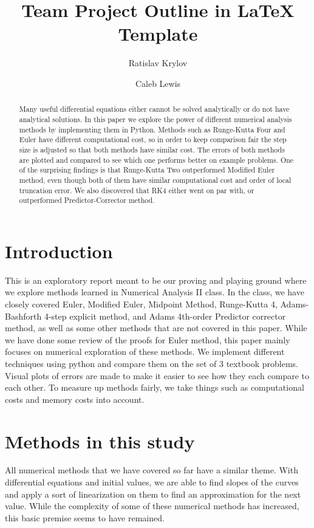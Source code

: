 \documentclass[11pt]{article}	%
\title{Team Project Outline in LaTeX Template}
\author{Ratislav Krylov \and Caleb Lewis}
\date{} %
\begin{document}
\maketitle

\begin{abstract}
Many useful differential equations either cannot be solved analytically or do not have analytical solutions. 
In this paper we explore the power of different numerical analysis methods by implementing
them in Python.
Methods such as Runge-Kutta Four and Euler have different computational cost, so in order
to keep comparison fair the step size is adjusted so that both methods have similar cost.
The errors of both methods are plotted and compared to see which one performs better on
example problems. One of the surprising findings is that Runge-Kutta Two outperformed 
Modified Euler method, even though both of them have similar computational cost and order of 
local truncation error. We also discovered that RK4 either went on par with, or outperformed Predictor-Corrector method. 
\end{abstract}

\section{Introduction}
This is an exploratory report meant to be our proving and playing ground where we explore
methods learned in Numerical Analysis II class. In the class, we have closely covered Euler,
Modified Euler, Midpoint Method, Runge-Kutta 4, Adams-Bashforth 4-step explicit method,
and Adams 4th-order Predictor corrector method, as well as some other methods that are not
covered in this paper. While we have done some review of the proofs for Euler method, this 
paper mainly focuses on numerical exploration of these methods. We implement different techniques using python and compare them on the set of 3 textbook problems. Visual plots of errors are made 
to make it easier to see how they each compare to each other. To measure up methods fairly, we take
things such as computational costs and memory costs into account.

\section{Methods in this study}
All numerical methods that we have covered so far have a similar theme. With differential equations and initial values, we are able to find slopes of the curves and apply a sort of linearization on them to find an approximation for the next value. While the complexity of some of these numerical methods has increased, this basic premise seems to have remained. 
\end{document}
